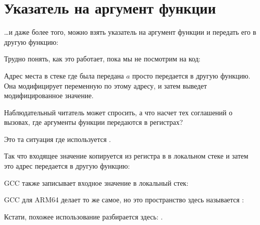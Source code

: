 \section{Указатель на аргумент функции}
\label{pointer_to_argument}

\dots и даже более того, можно взять указатель на аргумент функции и передать его в другую функцию:



Трудно понять, как это работает, пока мы не посмотрим на код:



Адрес места в стеке где была передана $a$ просто передается в другую функцию.
Она модифицирует переменную по этому адресу, и затем \printf выведет модифицированное значение.

\par Наблюдательный читатель может спросить, а что насчет тех соглашений о вызовах, где аргументы функции
передаются в регистрах?

Это та ситуация где используется .

Так что входящее значение копируется из регистра в  в локальном стеке и затем это адрес
передается в другую функцию:



GCC также записывает входное значение в локальный стек:



GCC для ARM64 делает то же самое, но это пространство здесь называется :



Кстати, похожее использование  разбирается здесь: .

